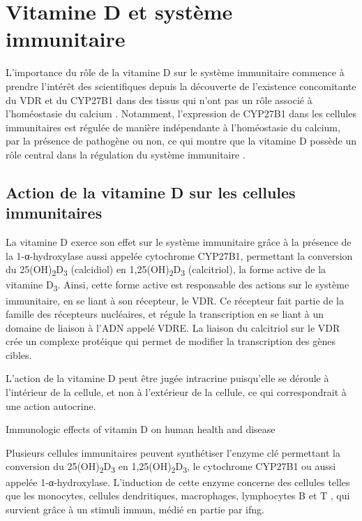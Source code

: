 \documentclass[
  a4paper,
  DIV=11,
  numbers=noendperiod,
  listof=totoc]{scrreprt}
\begin{document}
\newpage{}

\hypertarget{vitamine-d-et-systuxe8me-immunitaire}{%
\chapter{Vitamine D et système
immunitaire}\label{vitamine-d-et-systuxe8me-immunitaire}}

L'importance du rôle de la vitamine D sur le système immunitaire
commence à prendre l'intérêt des scientifiques depuis la découverte de
l'existence concomitante du \ac{VDR} et du CYP27B1 dans des tissus qui
n'ont pas un rôle associé à l'homéostasie du calcium
\autocite{Zehnder.2001}. Notamment, l'expression de CYP27B1 dans les
cellules immunitaires est régulée de manière indépendante à
l'homéostasie du calcium, par la présence de pathogène ou non, ce qui
montre que la vitamine D possède un rôle central dans la régulation du
système immunitaire \autocite{White.2022}.

\hypertarget{action-de-la-vitamine-d-sur-les-cellules-immunitaires}{%
\section{Action de la vitamine D sur les cellules
immunitaires}\label{action-de-la-vitamine-d-sur-les-cellules-immunitaires}}

La vitamine D exerce son effet sur le système immunitaire grâce à la
présence de la 1-α-hydroxylase aussi appelée cytochrome CYP27B1,
permettant la conversion du 25(OH)\textsubscript{2}D\textsubscript{3}
(calcidiol) en 1,25(OH)\textsubscript{2}D\textsubscript{3} (calcitriol),
la forme active de la vitamine D\textsubscript{3}. Ainsi, cette forme
active est responsable des actions sur le système immunitaire, en se
liant à son récepteur, le VDR. Ce récepteur fait partie de la famille
des récepteurs nucléaires, et régule la transcription en se liant à un
domaine de liaison à l'ADN appelé \ac{VDRE}. La liaison du calcitriol
sur le VDR crée un complexe protéique qui permet de modifier la
transcription des gènes cibles.

L'action de la vitamine D peut être jugée intracrine puisqu'elle se
déroule à l'intérieur de la cellule, et non à l'extérieur de la cellule,
ce qui correspondrait à une action autocrine.

Immunologic effects of vitamin D on human health and disease

Plusieurs cellules immunitaires peuvent synthétiser l'enzyme clé
permettant la conversion du 25(OH)\textsubscript{2}D\textsubscript{3} en
1,25(OH)\textsubscript{2}D\textsubscript{3}, le cytochrome CYP27B1 ou
aussi appelée 1-α-hydroxylase. L'induction de cette enzyme concerne des
cellules telles que les monocytes, cellules dendritiques, macrophages,
lymphocytes B et T \autocite{Meza-Meza.2020,Dankers.2017}, qui survient
grâce à un stimuli immun, médié en partie par \ac{ifng}.
\end{document}
